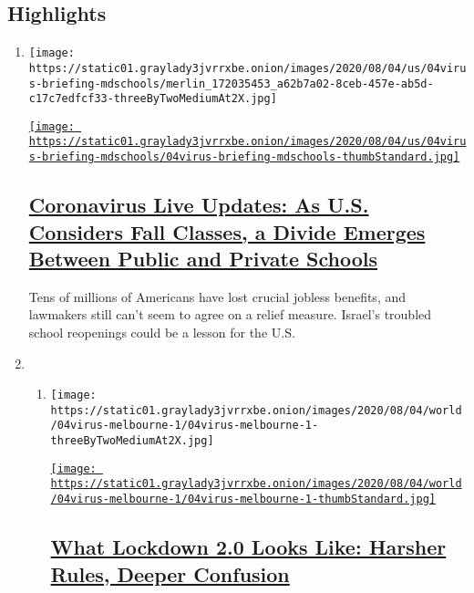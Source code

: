 \hypertarget{highlights}{%
\subsection{Highlights}\label{highlights}}

\begin{enumerate}
\def\labelenumi{\arabic{enumi}.}
\item
  \texttt{[image: https://static01.graylady3jvrrxbe.onion/images/2020/08/04/us/04virus-briefing-mdschools/merlin\_172035453\_a62b7a02-8ceb-457e-ab5d-c17c7edfcf33-threeByTwoMediumAt2X.jpg]}

  \href{/2020/08/04/world/coronavirus-cases.html}{\texttt{[image: https://static01.graylady3jvrrxbe.onion/images/2020/08/04/us/04virus-briefing-mdschools/04virus-briefing-mdschools-thumbStandard.jpg]}}

  \hypertarget{coronavirus-live-updates-as-us-considers-fall-classes-a-divide-emerges-between-public-and-private-schools}{%
  \subsection{\texorpdfstring{\href{/2020/08/04/world/coronavirus-cases.html}{Coronavirus
  Live Updates: As U.S. Considers Fall Classes, a Divide Emerges Between
  Public and Private
  Schools}}{Coronavirus Live Updates: As U.S. Considers Fall Classes, a Divide Emerges Between Public and Private Schools}}\label{coronavirus-live-updates-as-us-considers-fall-classes-a-divide-emerges-between-public-and-private-schools}}

  Tens of millions of Americans have lost crucial jobless benefits, and
  lawmakers still can't seem to agree on a relief measure. Israel's
  troubled school reopenings could be a lesson for the U.S.
\item
  \begin{enumerate}
  \def\labelenumii{\arabic{enumii}.}
  \item
    \texttt{[image: https://static01.graylady3jvrrxbe.onion/images/2020/08/04/world/04virus-melbourne-1/04virus-melbourne-1-threeByTwoMediumAt2X.jpg]}

    \href{/2020/08/04/world/australia/coronavirus-melbourne-lockdown.html}{\texttt{[image: https://static01.graylady3jvrrxbe.onion/images/2020/08/04/world/04virus-melbourne-1/04virus-melbourne-1-thumbStandard.jpg]}}

    \hypertarget{what-lockdown-20-looks-like-harsher-rules-deeper-confusion}{%
    \subsection{\texorpdfstring{\href{/2020/08/04/world/australia/coronavirus-melbourne-lockdown.html}{What
    Lockdown 2.0 Looks Like: Harsher Rules, Deeper
    Confusion}}{What Lockdown 2.0 Looks Like: Harsher Rules, Deeper Confusion}}\label{what-lockdown-20-looks-like-harsher-rules-deeper-confusion}}


\end{enumerate}
\end{enumerate}
